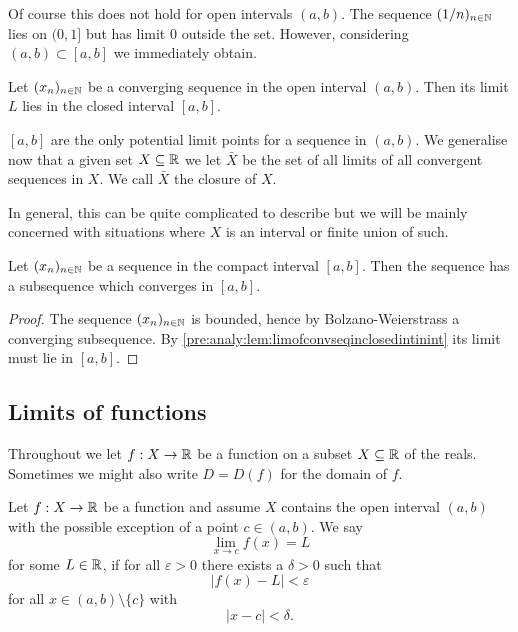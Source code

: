 \documentclass[10pt, a4paper]{article}
\newcommand{\seq}[1][x]{(#1_n)_{n \in \N}}
\begin{document}
Of course this does not hold for open intervals $(a, b)$.
The sequence $(1/n)_{n \in \mathbb{N}}$ lies on $(0, 1]$ but has limit $0$ outside the set.
However,
considering $(a, b) \subset [a, b]$ we immediately obtain.

\begin{corollary}
    Let $\seq$ be a converging sequence in the open interval $(a, b)$.
    Then its limit $L$ lies in the closed interval $[a, b]$.
\end{corollary}

$[a, b]$ are the only potential limit points for a sequence in $(a, b)$.
We generalise now that a given set $X \subseteq \mathbb{R}$ we let $\bar{X}$ be the set of all limits of all convergent sequences in $X$.
We call $\bar{X}$ the closure of $X$.

In general,
this can be quite complicated to describe but we will be mainly concerned with situations where $X$ is an interval or finite union of such.

\begin{corollary}
    Let $\seq$ be a sequence in the compact interval $[a, b]$.
    Then the sequence has a subsequence which converges in $[a, b]$.

    \begin{proof}
        The sequence $\seq$ is bounded,
        hence by Bolzano-Weierstrass a converging subsequence.
        By \autoref{pre:analy:lem:limofconvseqinclosedintinint} its limit must lie in $[a, b]$.
    \end{proof}
\end{corollary}

\subsection{Limits of functions}
Throughout we let $f : X \rightarrow \mathbb{R}$ be a function on a subset $X \subseteq \mathbb{R}$ of the reals.
Sometimes we might also write $D = D(f)$ for the domain of $f$.

\begin{definition}
    Let $f : X \rightarrow \mathbb{R}$ be a function and assume $X$ contains the open interval $(a, b)$ with the possible exception of a point $c \in (a, b)$.
    We say
    \[
    \lim_{x \rightarrow c}f(x) = L
    \]
    for some $L \in \mathbb{R}$,
    if for all $\varepsilon > 0$ there exists a $\delta > 0$ such that
    \[
    |f(x) - L| < \varepsilon
    \]
    for all $x \in (a, b) \setminus \{c\}$ with
    \[
    |x - c| < \delta.
    \]
\end{definition}
\end{document}
